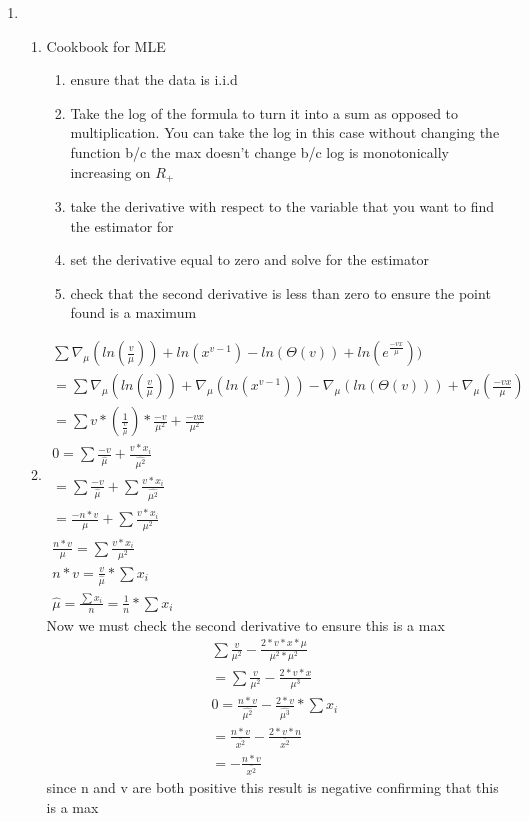 \documentclass{article}
\begin{document}
\begin{enumerate}
\begin{enumerate}
		\end{enumerate}
		
		\item
		
			\begin{enumerate}
				\item Cookbook for MLE
					
					\begin{enumerate}
						\item ensure that the data is i.i.d
						\item Take the log of the formula to turn it into a sum as opposed to multiplication. You can take the log in this case without changing the function b/c the max doesn't change b/c log is monotonically increasing on $R_{+}$
						\item take the derivative with respect to the variable that you want to find the estimator for
						\item set the derivative equal to zero and solve for the estimator
						\item check that the second derivative is less than zero to ensure the point found is a maximum
					\end{enumerate}
				
				\item
					
					\begin{align*}
						\sum \nabla_{\mu}(ln(\frac{v}{\mu})) + ln(x^{v-1})-ln(\Theta(v))+ln(e^{\frac{-vx}{\mu}})) \\
						= \sum \nabla_{\mu}(ln(\frac{v}{\mu})) + \nabla_{\mu}(ln(x^{v-1}))-\nabla_{\mu}(ln(\Theta(v)))+\nabla_{\mu}(\frac{-vx}{\mu}) \\	
						 = \sum v*(\frac{1}{\frac{v}{\mu}})*\frac{-v}{\mu^{2}}+\frac{-vx}{\mu^{2}} \\
						0 =  \sum \frac{-v}{\hat{\mu}}+\frac{v*x_{i}}{\hat{\mu^{2}}} \\
						= \sum \frac{-v}{\hat{\mu}}+ \sum \frac{v*x_{i}}{\hat{\mu^{2}}} \\
						= \frac{-n*v}{\mu}+\sum\frac{v*x_{i}}{\mu^{2}} \\
						\frac{n*v}{\mu} = \sum\frac{v*x_{i}}{\mu^{2}} \\
						n*v = \frac{v}{\hat{\mu}}*\sum x_{i} \\
						\hat{\mu} = \frac{\sum x_{i}}{n} = \frac{1}{n}* \sum x_{i}
					\end{align*}
					Now we must check the second derivative to ensure this is a max
					\begin{align*}
					\sum \frac{v}{\mu^{2}}-\frac{2*v*x*\mu}{\mu^{2}*\mu^{2}} \\
					= \sum \frac{v}{\mu^{2}}-\frac{2*v*x}{\mu^{3}} \\
					0 = \frac{n*v}{\hat{\mu^{2}}} - \frac{2*v}{\hat{\mu^{3}}}*\sum x_{i} \\
					= \frac{n*v}{\bar{x^{2}}}-\frac{2*v*n}{\bar{x^{2}}} \\
					= -\frac{n*v}{\bar{x^{2}}}
					\end{align*}
					since n and v are both positive this result is negative confirming that this is a max
					

\end{enumerate}
\end{enumerate}
\end{document}
